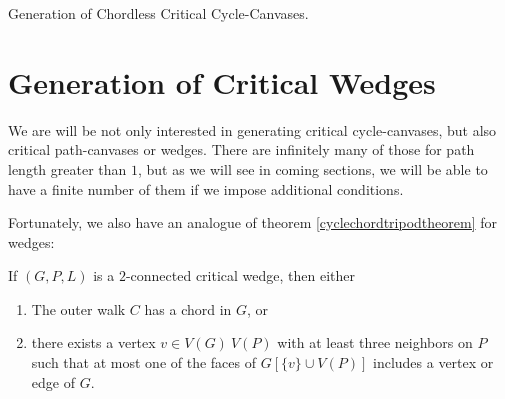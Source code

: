 \begin{algorithm}[H]
\caption{Generation of Chordless Critical Cycle-Canvases.}
\SetAlgoLined
{}



\end{algorithm}


\section{Generation of Critical Wedges}

We are will be not only interested in generating critical cycle-canvases, but also critical path-canvases or wedges. 
There are infinitely many of those for path length greater than $1$, but as we will see in coming sections, 
we will be able to have a finite number of them if we impose additional conditions. 

Fortunately, we also have an analogue of theorem \ref{cyclechordtripodtheorem} for wedges:

\begin{theorem}
If $(G, P, L)$ is a $2$-connected critical wedge, then either

\begin{enumerate}
\item The outer walk $C$ has a chord in $G$, or
\item there exists a vertex $v \in V(G) \ V(P)$ with at least three neighbors on $P$ such that at most one of the faces of 
$G[\{v\} \cup V(P)]$ includes a vertex or edge of $G$. 
\end{enumerate}
\end{theorem}

